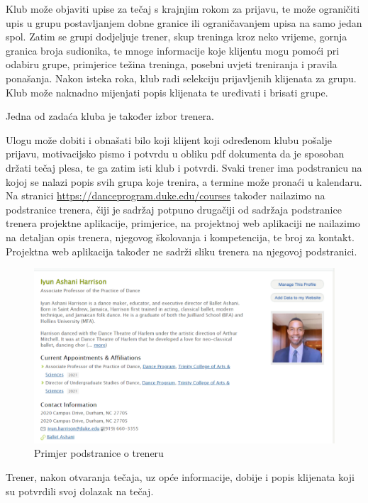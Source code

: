 \noindent Klub može objaviti upise za tečaj s krajnjim rokom za prijavu, te može ograničiti upis u grupu postavljanjem dobne granice ili ograničavanjem upisa na samo jedan spol. Zatim se grupi dodjeljuje trener, skup treninga kroz neko vrijeme, gornja granica broja sudionika, te mnoge informacije koje klijentu mogu pomoći pri odabiru grupe, primjerice težina treninga, posebni uvjeti treniranja i pravila ponašanja. Nakon isteka roka, klub radi selekciju prijavljenih klijenata za grupu. Klub može naknadno mijenjati popis klijenata te uređivati i brisati grupe.

\noindent Jedna od zadaća kluba je također izbor trenera.

\noindent Ulogu  može dobiti i obnašati bilo koji klijent koji određenom klubu pošalje prijavu, motivacijsko pismo i potvrdu u obliku pdf dokumenta da je sposoban držati tečaj plesa, te ga zatim isti klub i potvrdi. Svaki trener ima podstranicu na kojoj se nalazi popis svih grupa koje trenira, a termine može pronaći u kalendaru. Na stranici \url{https://danceprogram.duke.edu/courses} također nailazimo na podstranice trenera, čiji je sadržaj potpuno drugačiji od sadržaja podstranice trenera projektne aplikacije, primjerice, na projektnoj web aplikaciji ne nailazimo na detaljan opis trenera, njegovog školovanja i kompetencija, te broj za kontakt. Projektna web aplikacija također ne sadrži sliku trenera na njegovoj podstranici.

\begin{figure}[H]
	\centering
	\includegraphics[scale=0.3]{slike/opis_4.png}
	\caption{Primjer podstranice o treneru}
	\label{fig:screenshot004}
\end{figure}

\noindent Trener, nakon otvaranja tečaja, uz opće informacije, dobije i popis klijenata koji su potvrdili svoj dolazak na tečaj.

